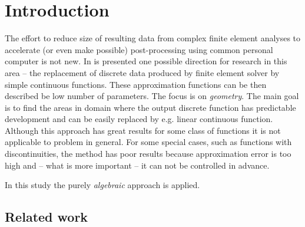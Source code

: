 \section{Introduction}
\label{sec:introduction}


The effort to reduce size of resulting data from complex finite element analyses to accelerate (or even make possible) post-processing using common personal computer is not new.
In \cite{Benes2015} is presented one possible direction for research in this area -- the replacement of discrete data produced by finite element solver by simple continuous functions. These approximation functions can be then described be low number of parameters. The focus is on \textit{geometry}. The main goal is to find the areas in domain where the output discrete function has predictable development and can be easily replaced by e.g. linear continuous function. Although this approach has great results for some class of functions it is not applicable to problem in general. For some special cases, such as functions with discontinuities, the method has poor results because approximation error is too high and -- what is more important -- it can not be controlled in advance.

In this study the purely \textit{algebraic} approach is applied.


\subsection{Related work}